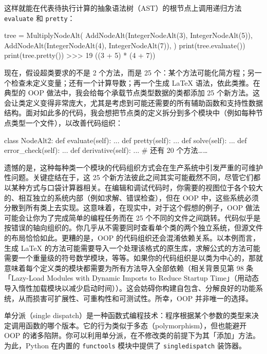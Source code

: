 这样就能在代表待执行计算的抽象语法树（AST）的根节点上调用递归方法 \texttt{evaluate} 和 \texttt{pretty}：

\begin{codebox}[python]
tree = MultiplyNodeAlt(
    AddNodeAlt(IntegerNodeAlt(3), IntegerNodeAlt(5)),
    AddNodeAlt(IntegerNodeAlt(4), IntegerNodeAlt(7)),
)
print(tree.evaluate())
print(tree.pretty())
>>>
19
((3 + 5) * (4 + 7))
\end{codebox}

现在，假设超类要求的不是 2 个方法，而是 25 个：某个方法可能化简方程；另一个检查未定义变量；还有一个计算导数；再一个生成 LaTeX 语法，依此类推。在典型的 OOP 做法中，我会给每个承载节点类型数据的类都添加 25 个新方法。这会让类定义变得非常庞大，尤其是考虑到可能还需要的所有辅助函数和支持性数据结构。面对如此多的代码，我会想把节点类的定义拆分到多个模块中（例如每种节点类型一个文件），以改善代码组织：

\begin{codebox}[python]
class NodeAlt2:
    def evaluate(self):
        ...
    def pretty(self):
        ...
    def solve(self):
        ...
    def error_check(self):
        ...
    def derivative(self):
        ...
    # 还有 20 个方法……
\end{codebox}

遗憾的是，这种每种类一个模块的代码组织方式会在生产系统中引发严重的可维护性问题。关键症结在于，这 25 个新方法彼此之间其实可能截然不同，尽管它们都以某种方式与口袋计算器相关。在编辑和调试代码时，你需要的视图位于各个较大的、相互独立的系统内部（例如求解、错误检查），但在 OOP 中，这些系统必须分散到所有类上去实现。这意味着，在现实中，对于这个假想的例子，OOP 做法可能会让你为了完成简单的编程任务而在 25 个不同的文件之间跳转。代码似乎是按错误的轴向组织的。你几乎从不需要同时查看单个类的两个独立系统，但源文件的布局恰恰如此。更糟的是，OOP 的代码组织还会混淆依赖关系。以本例而言，生成 LaTeX 的方法可能需要导入一个处理该格式的原生库，求解公式的方法可能需要一个重量级的符号数学模块，等等。如果你的代码组织是以类为中心的，那就意味着每个定义类的模块都需要为所有方法导入全部依赖（相关背景见第 98 条「Lazy-Load Modules with Dynamic Imports to Reduce Startup Time」（用动态导入惰性加载模块以减少启动时间））。这会妨碍你构建自包含、分解良好的功能系统，从而损害可扩展性、可重构性和可测试性。所幸，OOP 并非唯一的选择。

单分派（single dispatch）是一种函数式编程技术：程序根据某个参数的类型来决定调用函数的哪个版本。它的行为类似于多态（polymorphism），但也能避开 OOP 的诸多陷阱。你可以利用单分派，在不修改类的前提下为其「添加」方法。为此，Python 在内置的 \texttt{functools} 模块中提供了 \texttt{singledispatch} 装饰器。

